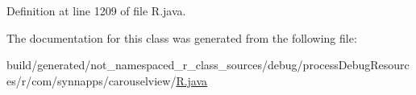 Definition at line 1209 of file R.\+java.



The documentation for this class was generated from the following file\+:\begin{DoxyCompactItemize}
\item 
build/generated/not\+\_\+namespaced\+\_\+r\+\_\+class\+\_\+sources/debug/process\+Debug\+Resources/r/com/synnapps/carouselview/\mbox{\hyperlink{com_2synnapps_2carouselview_2_r_8java}{R.\+java}}\end{DoxyCompactItemize}
